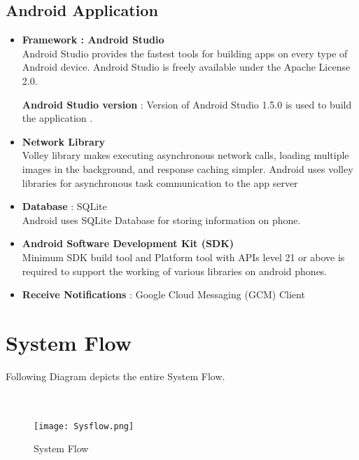 \subsection{Android Application}

\begin{itemize}
\item \textbf{Framework : Android Studio} \\
Android Studio provides the fastest tools for building apps on every type of Android device. Android Studio is freely available under the Apache License 2.0.

\textbf{Android Studio version} : Version of Android Studio 1.5.0 is used to build the application \cite{Intro42:online}.

\item \textbf{Network Library} \\
Volley library makes executing asynchronous network calls, loading multiple images in the background, and response caching simpler. Android uses volley libraries for asynchronous task communication to the app server \cite{Andro34:online}

\item \textbf{Database} : SQLite \\
Android uses SQLite Database for storing information on phone.

\item \textbf{Android Software Development Kit (SDK)}\\
Minimum SDK build tool and Platform tool with APIs level 21 or above is required to support the working of various libraries on android phones.

\item \textbf{Receive Notifications} : Google Cloud Messaging (GCM) Client
\end{itemize}

\pagebreak
\section{System Flow}

Following Diagram depicts the entire System Flow.\\ \\ \\
\begin{figure}[H]
    \centering
	\texttt{[image: Sysflow.png]}
    \caption{System Flow}
    \label{fig:System Flow}
\end{figure}


